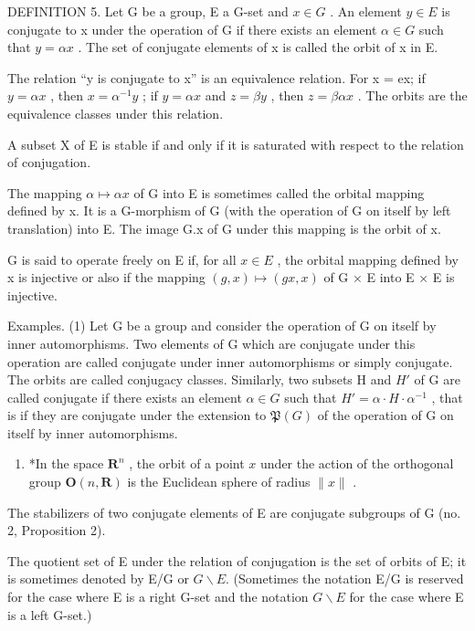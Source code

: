 DEFINITION 5. Let G be a group, E a G-set and \(x \in G\) . An element \(y \in E\) is conjugate to x under the operation of G if there exists an element \(\alpha \in G\) such that \(y = \alpha x\) . The set of conjugate elements of x is called the orbit of x in E.

The relation ``y is conjugate to x'' is an equivalence relation. For x = ex; if \(y = \alpha x\) , then \(x = \alpha^{-1} y\) ; if \(y = \alpha x\) and \(z = \beta y\) , then \(z = \beta \alpha x\) . The orbits are the equivalence classes under this relation.

A subset X of E is stable if and only if it is saturated with respect to the relation of conjugation.

The mapping \(\alpha\mapsto\alpha x\) of G into E is sometimes called the orbital mapping defined by x. It is a G-morphism of G (with the operation of G on itself by left translation) into E. The image G.x of G under this mapping is the orbit of x.

G is said to operate freely on E if, for all \(x \in E\) , the orbital mapping defined by x is injective or also if the mapping \((g, x) \mapsto (gx, x)\) of G × E into E × E is injective.

Examples. (1) Let G be a group and consider the operation of G on itself by inner automorphisms. Two elements of G which are conjugate under this operation are called conjugate under inner automorphisms or simply conjugate. The orbits are called conjugacy classes. Similarly, two subsets H and \(H'\) of G are called conjugate if there exists an element \(\alpha \in G\) such that \(H' = \alpha \cdot H \cdot \alpha^{-1}\) , that is if they are conjugate under the extension to \(\mathfrak{P}(G)\) of the operation of G on itself by inner automorphisms.

\begin{enumerate}
\def\labelenumi{(\arabic{enumi})}
\setcounter{enumi}{1}
\tightlist
\item
  *In the space \(\mathbf{R}^n\) , the orbit of a point \(x\) under the action of the orthogonal group \(\mathbf{O}(n, \mathbf{R})\) is the Euclidean sphere of radius \(\| x \|\) .
\end{enumerate}

The stabilizers of two conjugate elements of E are conjugate subgroups of G (no. 2, Proposition 2).

The quotient set of E under the relation of conjugation is the set of orbits of E; it is sometimes denoted by E/G or \(G\backslash E\). (Sometimes the notation E/G is reserved for the case where E is a right G-set and the notation \(G\backslash E\) for the case where E is a left G-set.)

